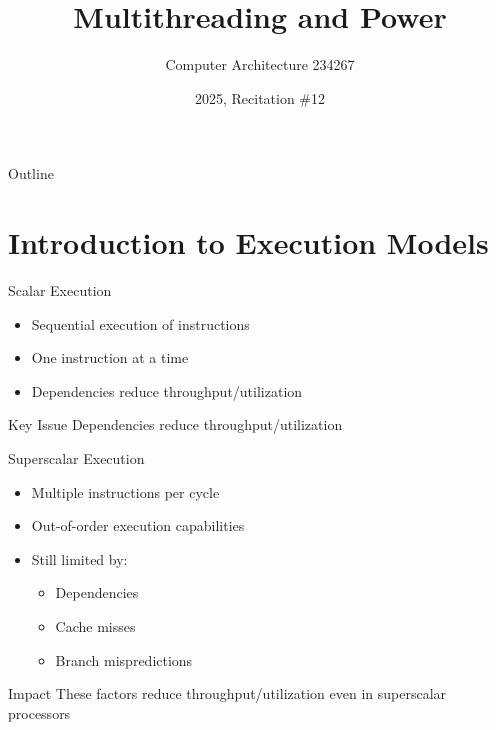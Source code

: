 \documentclass[aspectratio=169,12pt]{beamer}
\title{Multithreading and Power}
\author{Computer Architecture 234267}
\date{2025, Recitation \#12}
\begin{document}
\frame{\titlepage}

\begin{frame}{Outline}
\tableofcontents
\end{frame}

\section{Introduction to Execution Models}

\begin{frame}{Scalar Execution}
\begin{itemize}
    \item Sequential execution of instructions
    \item One instruction at a time
    \item Dependencies reduce throughput/utilization
\end{itemize}

\vspace{0.5cm}
\begin{center}
\end{center}

\begin{alertblock}{Key Issue}
Dependencies reduce throughput/utilization
\end{alertblock}
\end{frame}

\begin{frame}{Superscalar Execution}
\begin{itemize}
    \item Multiple instructions per cycle
    \item Out-of-order execution capabilities
    \item Still limited by:
    \begin{itemize}
        \item Dependencies
        \item Cache misses
        \item Branch mispredictions
    \end{itemize}
\end{itemize}

\begin{block}{Impact}
These factors reduce throughput/utilization even in superscalar processors
\end{block}
\end{frame}
\end{document}

